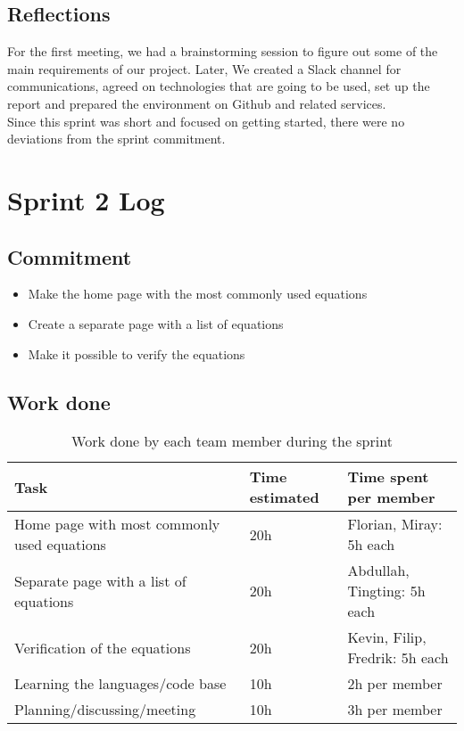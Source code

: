 \documentclass[14]{article}
\begin{document}
\subsection{Reflections}
For the first meeting, we had a brainstorming session to figure out some of the main requirements of our project. Later, We created a Slack channel for communications, agreed on technologies that are going to be used, set up the report and prepared the environment on Github and related services.\\
Since this sprint was short and focused on getting started, there were no deviations from the sprint commitment.

\section{Sprint 2 Log}

\subsection{Commitment}

\begin{itemize}
    \item Make the home page with the most commonly used equations
    \item Create a separate page with a list of equations
    \item Make it possible to verify the equations
\end{itemize}

\subsection{Work done}

\begin{table}[H]
    \centering
    \begin{tabular}{|p{}|l|p{}|}
        \hline
        \textbf{Task} & \textbf{Time estimated} & \textbf{Time spent per member}  \\
        \hline
        Home page with most commonly used equations & 20h & Florian, Miray: 5h each \\
        \hline
        Separate page with a list of equations & 20h & Abdullah, Tingting: 5h each\\
        \hline
        Verification of the equations & 20h & Kevin, Filip, Fredrik: 5h each \\
        \hline
        Learning the languages/code base & 10h & 2h per member \\
        \hline
        Planning/discussing/meeting & 10h & 3h per member \\
        \hline
        
    \end{tabular}
    \caption{Work done by each team member during the sprint}
    \label{tab:my_label}
\end{table}
\end{document}
